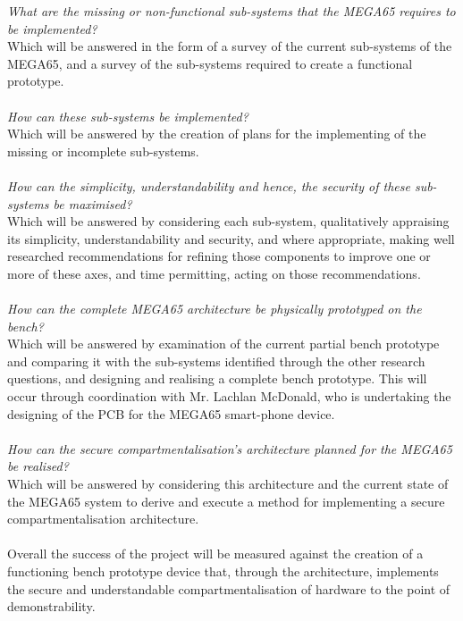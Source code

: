 \textit{What are the missing or non-functional sub-systems that the MEGA65 requires to be implemented?}\\
Which will be answered in the form of a survey of the current sub-systems of the MEGA65, and a survey of the sub-systems required to create a functional prototype.\\
\\
\textit{How can these sub-systems be implemented?}\\
Which will be answered by the creation of plans for the implementing of the missing or incomplete sub-systems.\\
\\
\textit{How can the simplicity, understandability and hence, the security of these sub-systems be maximised?}\\
Which will be answered by considering each sub-system, qualitatively appraising its simplicity, understandability and security, and where appropriate, making well researched recommendations for refining those components to improve one or more of these axes, and time permitting, acting on those recommendations.\\
\\
\textit{How can the complete MEGA65 architecture be physically prototyped on the bench?}\\
Which will be answered by examination of the current partial bench prototype and comparing it with the sub-systems identified through the other research questions, and designing and realising a complete bench prototype.
This will occur through coordination with Mr. Lachlan McDonald, who is undertaking the designing of the PCB for the MEGA65 smart-phone device.\\
\\
\textit{How can the secure compartmentalisation's architecture planned for the MEGA65 be realised?}\\
Which will be answered by considering this architecture and the current state of the MEGA65 system to derive and execute a method for implementing a secure compartmentalisation architecture.\\
\\
Overall the success of the project will be measured against the creation of a functioning bench prototype device that, through the architecture, implements the secure and understandable compartmentalisation of hardware to the point of demonstrability.



